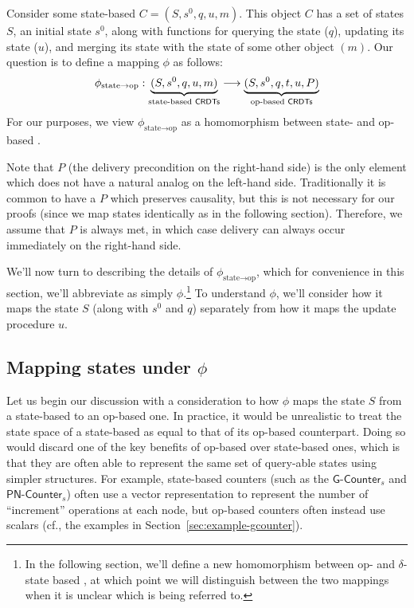 Consider some state-based \CRDT $C = (S, s^0, q, u, m)$. This object $C$ has a
set of states $S$, an initial state $s^0$, along with functions for querying the
state ($q$), updating its state ($u$), and merging its state with the state of
some other object $(m)$. Our question is to define a mapping $\phi$ as
follows:
\[
  \phi_{\text{state} \to \text{op}} :
    \underbrace{(S, s^0, q, u, m)}_{\text{state-based \textsf{CRDTs}}} \longrightarrow
    \underbrace{(S, s^0, q, t, u, P)}_{\text{op-based \textsf{CRDTs}}}
\]
For our purposes, we view $\phi_{\text{state} \to \text{op}}$ as a homomorphism
between state- and op-based \CRDTs.

Note that $P$ (the delivery precondition on the right-hand side) is the only
element which does not have a natural analog on the left-hand side.
Traditionally it is common to have a $P$ which preserves causality, but this is
not necessary for our proofs (since we map states identically as in the
following section). Therefore, we assume that $P$ is always met, in which case
delivery can always occur immediately on the right-hand side.

We'll now turn to describing the details of $\phi_{\text{state} \to \text{op}}$,
which for convenience in this section, we'll abbreviate as simply
$\phi$.\footnote{In the following section, we'll define a new homomorphism
between op- and $\delta$-state based \CRDTs, at which point we will
distinguish between the two mappings when it is unclear which is being referred
to.} To understand $\phi$, we'll consider how it maps the state $S$ (along with
$s^0$ and $q$) separately from how it maps the update procedure $u$.

\subsection{Mapping states under $\phi$}

Let us begin our discussion with a consideration to how $\phi$ maps the state
$S$ from a state-based \CRDT to an op-based one. In practice, it would be
unrealistic to treat the state space of a state-based \CRDT as equal to that of
its op-based counterpart. Doing so would discard one of the key benefits of
op-based \CRDTs over state-based ones, which is that they are often able to
represent the same set of query-able states using simpler structures. For
example, state-based counters (such as the $\textsf{G-Counter}_s$ and
$\textsf{PN-Counter}_s$) often use a vector representation to represent the
number of ``increment'' operations at each node, but op-based counters often
instead use scalars (cf., the examples in Section~\ref{sec:example-gcounter}).

